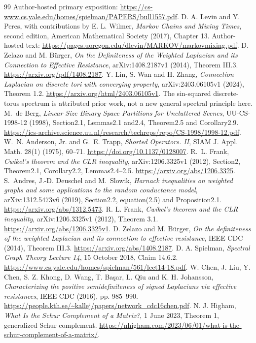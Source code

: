 \documentclass[11pt]{article}
\begin{document}
\begin{thebibliography}{99}
Author-hosted primary exposition:
\url{https://cs-www.cs.yale.edu/homes/spielman/PAPERS/bull1557.pdf}.
 D. A. Levin and Y. Peres, with contributions by
E. L. Wilmer, \emph{Markov Chains and Mixing Times}, second edition,
American Mathematical Society (2017), Chapter 13.
Author-hosted text: \url{https://pages.uoregon.edu/dlevin/MARKOV/markovmixing.pdf}.
 D. Zelazo and M. B{\"u}rger,
\emph{On the Definiteness of the Weighted Laplacian and its Connection to
Effective Resistance}, arXiv:1408.2187v1 (2014), Theorem III.3.
\url{https://arxiv.org/pdf/1408.2187}.
 Y. Lin, S. Wan and H. Zhang,
\emph{Connection Laplacian on discrete tori with converging property},
arXiv:2403.06105v1 (2024), Theorem 1.2.
\url{https://arxiv.org/html/2403.06105v1}.
The sin-squared discrete-torus spectrum is attributed prior work, not a new
general spectral principle here.
 M.~de Berg, \emph{Linear Size Binary Space Partitions for
Uncluttered Scenes}, UU-CS-1998-12 (1998), Section2.1, Lemmas2.1 and2.4,
Theorem2.5 and Corollary2.9.
\url{https://ics-archive.science.uu.nl/research/techreps/repo/CS-1998/1998-12.pdf}.
 W.~N. Anderson, Jr. and G.~E. Trapp,
\emph{Shorted Operators. II}, SIAM J. Appl. Math. 28(1) (1975), 60--71.
\url{https://doi.org/10.1137/0128007}.
 R.~L. Frank, \emph{Cwikel's theorem and the CLR inequality},
arXiv:1206.3325v1 (2012), Section2, Theorem2.1, Corollary2.2, Lemmas2.4--2.5.
\url{https://arxiv.org/abs/1206.3325}.
 S.~Andres, J.-D. Deuschel and M.~Slowik,
\emph{Harnack inequalities on weighted graphs and some applications to the random
conductance model}, arXiv:1312.5473v6 (2019), Section2.2, equation(2.5) and Proposition2.1.
\url{https://arxiv.org/abs/1312.5473}.
 R. L. Frank, \emph{Cwikel's theorem and the CLR inequality},
arXiv:1206.3325v1 (2012), Theorem 3.1.
\url{https://arxiv.org/abs/1206.3325v1}.
 D. Zelazo and M. B\"urger, \emph{On the definiteness of the
weighted Laplacian and its connection to effective resistance},
IEEE CDC (2014), Theorem III.3.
\url{https://arxiv.org/abs/1408.2187}.
 D. A. Spielman, \emph{Spectral Graph Theory Lecture 14},
15 October 2018, Claim 14.6.2.
\url{https://www.cs.yale.edu/homes/spielman/561/lect14-18.pdf}.
 W. Chen, J. Liu, Y. Chen, S. Z. Khong, D. Wang,
T. Ba\c{s}ar, L. Qiu and K. H. Johansson, \emph{Characterizing the positive
semidefiniteness of signed Laplacians via effective resistances},
IEEE CDC (2016), pp. 985--990.
\url{https://people.kth.se/~kallej/papers/network_cdc16chen.pdf}.
 N. J. Higham, \emph{What Is the Schur Complement of a Matrix?}, 1 June 2023, Theorem 1, generalized Schur complement. \url{https://nhigham.com/2023/06/01/what-is-the-schur-complement-of-a-matrix/}.


\end{thebibliography}
\end{document}
